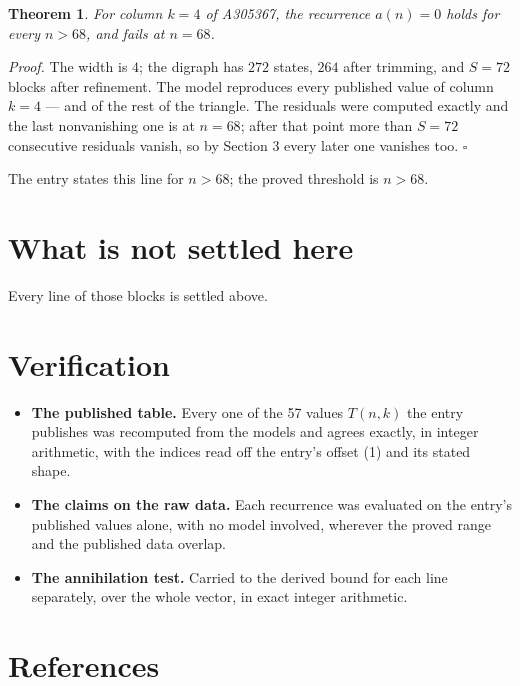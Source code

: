 \documentclass[11pt]{article}
\newtheorem{theorem}{Theorem}
\theoremstyle{definition}
\begin{document}
\begin{theorem} For column $k = 4$ of A305367, the recurrence $a(n) = 0$ holds for every $n > 68$, and fails at $n = 68$.\end{theorem}

{\itshape Proof.} The width is $4$; the digraph has $272$ states, $264$ after trimming, and $S = 72$ blocks after refinement. The model reproduces every published value of column $k = 4$ --- and of the rest of the triangle. The residuals were computed exactly and the last nonvanishing one is at $n = 68$; after that point more than $S = 72$ consecutive residuals vanish, so by Section 3 every later one vanishes too. $\square$

The entry states this line for $n > 68$; the proved threshold is $n > 68$.

\section{What is not settled here}

Every line of those blocks is settled above.

\section{Verification}

\begin{itemize}

\item {\bfseries The published table.} Every one of the 57 values $T(n,k)$ the entry publishes was recomputed from the models and agrees exactly, in integer arithmetic, with the indices read off the entry's offset (1) and its stated shape.

\item {\bfseries The claims on the raw data.} Each recurrence was evaluated on the entry's published values alone, with no model involved, wherever the proved range and the published data overlap.

\item {\bfseries The annihilation test.} Carried to the derived bound for each line separately, over the whole vector, in exact integer arithmetic.

\end{itemize}

\section{References}
\end{document}
